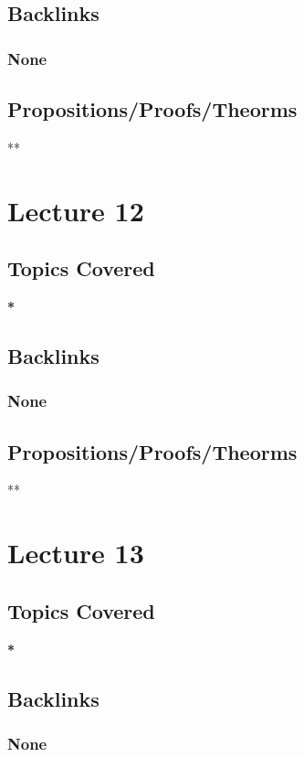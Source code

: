 \documentclass[11pt]{article}
\begin{document}
\subsection*{Backlinks}
\label{sec:org1ce07cc}
\subsubsection*{None}
\label{sec:orga9b1728}
\subsection*{Propositions/Proofs/Theorms}
\label{sec:org69c8c6f}
**

\section*{Lecture 12}
\label{sec:org582aabe}
\subsection*{Topics Covered}
\label{sec:orgc98b71c}
\textbf{*}
\subsection*{Backlinks}
\label{sec:orgdb5ddd5}
\subsubsection*{None}
\label{sec:org0841d3f}
\subsection*{Propositions/Proofs/Theorms}
\label{sec:org891e91c}
**

\section*{Lecture 13}
\label{sec:org93ffb13}
\subsection*{Topics Covered}
\label{sec:org88cba98}
\textbf{*}
\subsection*{Backlinks}
\label{sec:org082082a}
\subsubsection*{None}
\label{sec:org46dbc07}
\end{document}
